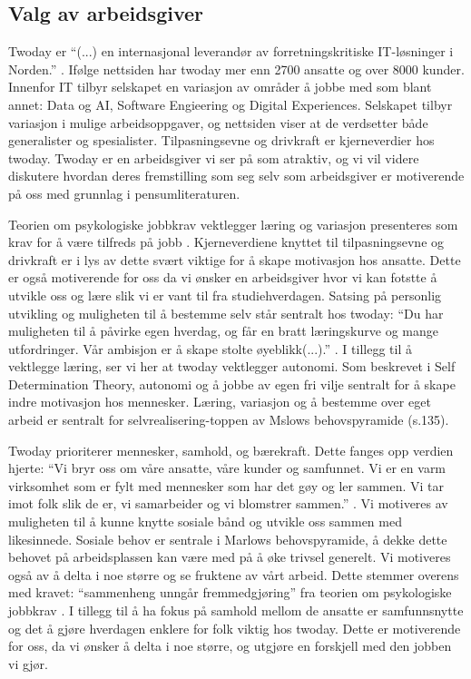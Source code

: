 \subsection{Valg av arbeidsgiver}
Twoday er \enquote{(...) en internasjonal leverandør av forretningskritiske IT-løsninger i Norden.}
\cite{twoday.no}. Ifølge nettsiden har twoday mer enn 2700 ansatte og over 8000 kunder. Innenfor IT
tilbyr selskapet en variasjon av områder å jobbe med som blant annet: Data og AI, Software Engieering
og Digital Experiences. Selskapet tilbyr variasjon i mulige arbeidsoppgaver, og nettsiden viser at de
verdsetter både generalister og spesialister. Tilpasningsevne og drivkraft er kjerneverdier hos twoday. Twoday er
en arbeidsgiver vi ser på som atraktiv, og vi vil videre diskutere hvordan deres fremstilling som seg selv som 
arbeidsgiver er motiverende på oss med grunnlag i pensumliteraturen. 

Teorien om psykologiske jobbkrav vektlegger læring og variasjon presenteres som krav for å være tilfreds på jobb \parencite[][s.120]{Teknologiledelse}. 
Kjerneverdiene knyttet til tilpasningsevne og drivkraft er i lys av dette svært viktige for å skape motivasjon hos ansatte. Dette er også motiverende for 
oss da vi ønsker en arbeidsgiver hvor vi kan fotstte å utvikle oss og lære slik vi er vant til fra studiehverdagen.
Satsing på personlig utvikling og muligheten til å bestemme selv står sentralt hos twoday: \enquote{Du har muligheten
til å påvirke egen hverdag, og får en bratt læringskurve og mange utfordringer. Vår ambisjon er å
skape stolte øyeblikk(...).} \parencite["Graduateprogrammet"]{Twoday.no}. I tillegg til å vektlegge læring, ser
vi her at twoday vektlegger autonomi. Som beskrevet i Self Determination Theory\parencite[][s.121]{Teknologiledelse},
autonomi og å jobbe av egen fri vilje sentralt for å skape indre motivasjon hos mennesker. Læring,
variasjon og å bestemme over eget arbeid er sentralt for selvrealisering-toppen av Mslows
behovspyramide \parencite[][s.116]{Teknologiledelse}(s.135).

Twoday prioriterer mennesker, samhold, og bærekraft. Dette fanges opp verdien hjerte:
“Vi bryr oss om våre ansatte, våre kunder og samfunnet. Vi er en varm virksomhet som er fylt
med mennesker som har det gøy og ler sammen. Vi tar imot folk slik de er, vi samarbeider og vi
blomstrer sammen.” \parencite["Om oss"]{Twoday.no}. Vi motiveres av muligheten til å kunne knytte sosiale bånd
og utvikle oss sammen med likesinnede. Sosiale behov er sentrale i Marlows behovspyramide, å dekke
dette behovet på arbeidsplassen kan være med på å øke trivsel generelt. Vi motiveres også av å delta
i noe større og se fruktene av vårt arbeid. Dette stemmer overens med kravet: “sammenheng unngår
fremmedgjøring” fra teorien om psykologiske jobbkrav \parencite[][s.120]{Teknologiledelse}. I tillegg til å ha fokus på samhold
mellom de ansatte er samfunnsnytte og det å gjøre hverdagen enklere for folk viktig hos
twoday\parencite["Graduateprogrammet"]{Twoday.no}. Dette er motiverende for oss, da vi ønsker å delta i noe
større, og utgjøre en forskjell med den jobben vi gjør.

